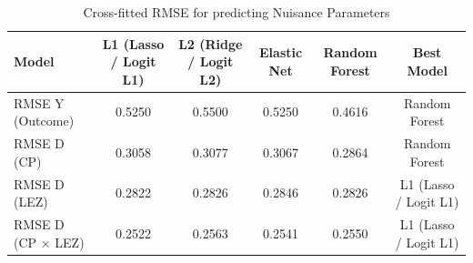 \begin{table}
\caption{Cross-fitted RMSE for predicting Nuisance Parameters}
\label{tab:rmse_evaluation}
\begin{tabular}{lccccc}
\toprule
Model & L1 (Lasso / Logit L1) & L2 (Ridge / Logit L2) & Elastic Net & Random Forest & Best Model \\
\midrule
RMSE Y (Outcome) & 0.5250 & 0.5500 & 0.5250 & 0.4616 & Random Forest \\
RMSE D (CP) & 0.3058 & 0.3077 & 0.3067 & 0.2864 & Random Forest \\
RMSE D (LEZ) & 0.2822 & 0.2826 & 0.2846 & 0.2826 & L1 (Lasso / Logit L1) \\
RMSE D (CP $\times$ LEZ) & 0.2522 & 0.2563 & 0.2541 & 0.2550 & L1 (Lasso / Logit L1) \\
\bottomrule
\end{tabular}
\end{table}
